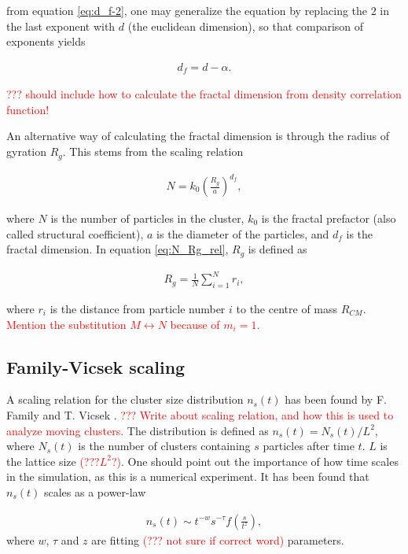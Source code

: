 from equation \eqref{eq:d_f-2}, one may generalize the equation by replacing the $2$ in the last exponent with $d$ (the euclidean dimension), so that comparison of exponents yields 

\begin{align}
d_f = d - \alpha.
\label{eq:d_f corr}
\end{align}

\textcolor{red}{??? should include how to calculate the fractal dimension from density correlation function!}

An alternative way of calculating the fractal dimension is through the radius of gyration $R_g$. This stems from the scaling relation 

\begin{align}
N = k_0\left(\frac{R_g}{a}\right)^{d_f},
\label{eq:N_Rg_rel}
\end{align}

where $N$ is the number of particles in the cluster, $k_0$ is the fractal prefactor (also called structural coefficient), $a$ is the diameter of the particles, and $d_f$ is the fractal dimension. In equation \eqref{eq:N_Rg_rel}, $R_g$ is defined as 

\begin{align}
R_g = \frac{1}{N} \sum_{i=1}^{N} r_i, 
\end{align}

where $r_i$ is the distance from particle number $i$ to the centre of mass $R_{CM}$. \textcolor{red}{Mention the substitution $M \leftrightarrow N$ because of $m_i = 1$. }

\subsection{Family-Vicsek scaling}
A scaling relation for the cluster size distribution $n_s(t)$ has been found by F. Family and T. Vicsek \cite{PhysRevLett.52.1669}. \textcolor{red}{??? Write about scaling relation, and how this is used to analyze moving clusters.} The distribution is defined as $n_s(t) = N_s(t) / L^2$, where $N_s(t)$ is the number of clusters containing $s$ particles after time $t$. $L$ is the lattice size \textcolor{red}{(???$L^2$?)}. One should point out the importance of how time scales in the simulation, as this is a numerical experiment. It has been found that $n_s(t)$ scales as a power-law

\begin{align}
n_s(t) \sim t^{-w}s^{-\tau}f\left(\frac{s}{t^z}\right),
\end{align}
where $w$, $\tau$ and $z$ are fitting \textcolor{red}{(??? not sure if correct word)} parameters. 